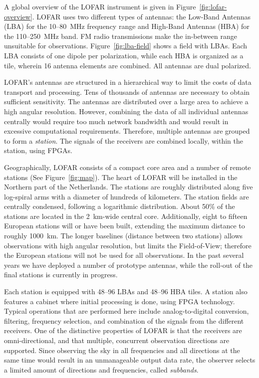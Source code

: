 \documentclass{sig-alternate}
\begin{document}
A global overview of the LOFAR instrument is given in
Figure~\ref{fig:lofar-overview}. LOFAR uses two different types of
antennas: the Low-Band Antennas (LBA) for the 10--80~MHz frequency
range and High-Band Antennas (HBA) for the 110--250~MHz band.
FM radio transmissions make the in-between range unsuitable for observations.
Figure~\ref{fig:lba-field} shows a field with LBAs. Each
LBA consists of one dipole per polarization, while each HBA is
organized as a tile, wherein 16 antenna elements are combined. All
antennas are dual polarized.

LOFAR's antennas are structured in a hierarchical way to limit the
costs of data transport and processing. Tens of thousands of antennas are
necessary to obtain sufficient sensitivity. The antennas are
distributed over a large area to achieve a high angular resolution.
However, combining the data of all individual antennas centrally would
require too much network bandwidth and would result in excessive
computational requirements. Therefore, multiple antennas are grouped
to form a \emph{station}.
The signals of the receivers are combined locally, within the station, using FPGAs.

Geographically, LOFAR consists of a compact core area and a number of
remote stations (See Figure~\ref{fig:map}).  The heart of LOFAR will
be installed in the Northern part of the Netherlands.  The stations
are roughly distributed along five log-spiral arms with a diameter of
hundreds of kilometers. 
The station fields are centrally condensed,
following a logarithmic distribution.  About 50\% of the stations are
located in the 2~km-wide central core.
Additionally, eight to fifteen European stations will or have been built,
extending the maximum distance to roughly 1000~km.
The longer baselines (distance between two stations) allows observations with high angular resolution,
but limits the Field-of-View; therefore the European stations will not be
used for all observations.
In the past several years we have deployed a number of prototype antennas,
while the roll-out of the final stations is currently in progress.

Each station is equipped with 48--96 LBAs and 48--96 HBA tiles. 
A station also features a cabinet where initial processing is done, using
FPGA technology.
Typical operations that are performed here include analog-to-digital
conversion, filtering, frequency selection, and combination of the signals
from the different receivers.
One of the distinctive properties of LOFAR is that the receivers are
omni-directional, and that multiple, concurrent observation directions are
supported.
Since observing the sky in all frequencies and all directions at the same time
would result in an unmanageable output data rate, the observer selects a
limited amount of directions and frequencies, called \emph{subbands}.
\end{document}

